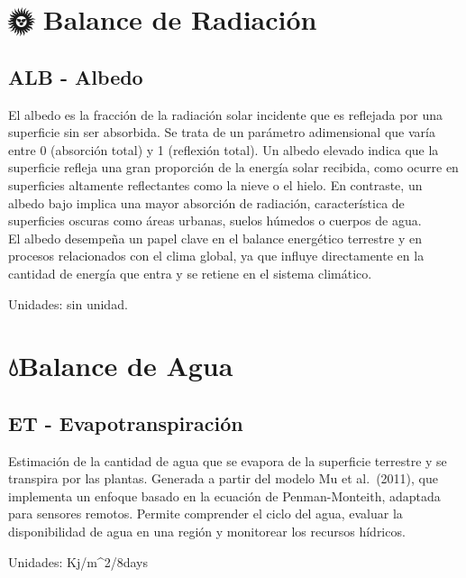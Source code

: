 \documentclass[
]{book}
\begin{document}
\section{\texorpdfstring{\textbf{🌞 Balance de Radiación}}{🌞 Balance de Radiación}}\label{balance-de-radiaciuxf3n-1}

\subsection{\texorpdfstring{\textbf{ALB} - Albedo}{ALB - Albedo}}\label{alb---albedo-1}

El albedo es la fracción de la radiación solar incidente que es reflejada por una superficie sin ser absorbida. Se trata de un parámetro adimensional que varía entre 0 (absorción total) y 1 (reflexión total). Un albedo elevado indica que la superficie refleja una gran proporción de la energía solar recibida, como ocurre en superficies altamente reflectantes como la nieve o el hielo. En contraste, un albedo bajo implica una mayor absorción de radiación, característica de superficies oscuras como áreas urbanas, suelos húmedos o cuerpos de agua.\\
El albedo desempeña un papel clave en el balance energético terrestre y en procesos relacionados con el clima global, ya que influye directamente en la cantidad de energía que entra y se retiene en el sistema climático.

Unidades: sin unidad.

\section{\texorpdfstring{\textbf{💧Balance de Agua}}{💧Balance de Agua}}\label{balance-de-agua-1}

\subsection{\texorpdfstring{\textbf{ET} - Evapotranspiración}{ET - Evapotranspiración}}\label{et---evapotranspiraciuxf3n-1}

Estimación de la cantidad de agua que se evapora de la superficie terrestre y se transpira por las plantas. Generada a partir del modelo Mu et al.~(2011), que implementa un enfoque basado en la ecuación de Penman-Monteith, adaptada para sensores remotos. Permite comprender el ciclo del agua, evaluar la disponibilidad de agua en una región y monitorear los recursos hídricos.

Unidades: Kj/m\^{}2/8days
\end{document}
